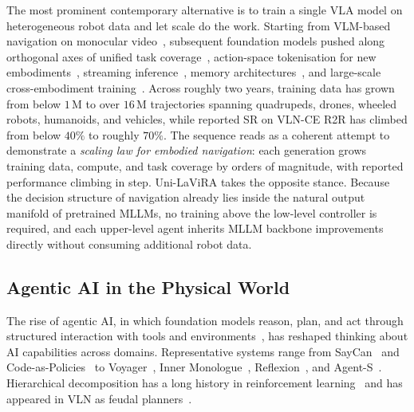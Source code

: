 \documentclass[conference]{IEEEtran}
\newcommand{\ourmethod}{Uni-LaViRA\xspace}
\begin{document}
The most prominent contemporary alternative is to train a single VLA model on
heterogeneous robot data and let scale do the work. Starting from VLM-based
navigation on monocular video~\cite{zhang2024navid}, subsequent foundation
models pushed along orthogonal axes of unified task
coverage~\cite{zhang2024uninavid,xue2025omninav}, action-space tokenisation
for new embodiments~\cite{cheng2024navila}, streaming
inference~\cite{wei2025streamvln}, memory
architectures~\cite{zeng2025janusvln,wei2025internvlan1}, and large-scale
cross-embodiment training~\cite{zhang2025navfom,chen2026abotn0}. Across
roughly two years, training data has grown from below $1$\,M to over $16$\,M
trajectories spanning quadrupeds, drones, wheeled robots, humanoids, and
vehicles, while reported SR on VLN-CE R2R has climbed from below $40\%$ to
roughly $70\%$. The sequence reads as a coherent attempt to demonstrate a
\emph{scaling law for embodied navigation}: each generation grows training
data, compute, and task coverage by orders of magnitude, with reported
performance climbing in step. {\ourmethod takes the opposite stance. Because
the decision structure of navigation already lies inside the natural output
manifold of pretrained MLLMs, no training above the low-level controller is
required, and each upper-level agent inherits MLLM backbone improvements
directly without consuming additional robot data.}

\subsection{Agentic AI in the Physical World}

The rise of agentic AI, in which foundation models reason, plan, and act
through structured interaction with tools and
environments~\cite{yao2023react}, has reshaped thinking about AI capabilities
across domains. Representative systems range from SayCan~\cite{ahn2022saycan}
and Code-as-Policies~\cite{liang2023cap} to Voyager~\cite{wang2024voyager},
Inner Monologue~\cite{huang2022inner}, Reflexion~\cite{shinn2023reflexion},
and Agent-S~\cite{agashe2025agents}. Hierarchical decomposition has a long
history in reinforcement learning~\cite{bellman1966dynamic,sutton1999between}
and has appeared in VLN as feudal planners~\cite{liu2023azhp,zhao2025nava3}.
\end{document}
